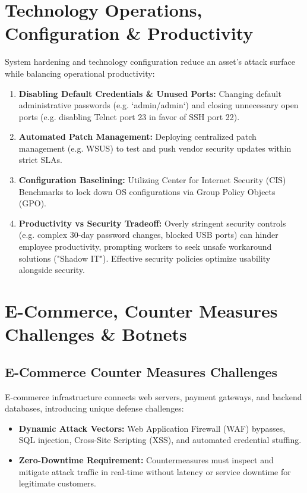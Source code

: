 \documentclass[12pt,a4paper]{article}
\begin{document}
\section{Technology Operations, Configuration \& Productivity}

System hardening and technology configuration reduce an asset's attack surface while balancing operational productivity:

\begin{enumerate}[leftmargin=*, itemsep=4pt]
  \item \textbf{Disabling Default Credentials \& Unused Ports:} Changing default administrative passwords (e.g. `admin/admin`) and closing unnecessary open ports (e.g. disabling Telnet port 23 in favor of SSH port 22).
  \item \textbf{Automated Patch Management:} Deploying centralized patch management (e.g. WSUS) to test and push vendor security updates within strict SLAs.
  \item \textbf{Configuration Baselining:} Utilizing Center for Internet Security (CIS) Benchmarks to lock down OS configurations via Group Policy Objects (GPO).
  \item \textbf{Productivity vs Security Tradeoff:} Overly stringent security controls (e.g. complex 30-day password changes, blocked USB ports) can hinder employee productivity, prompting workers to seek unsafe workaround solutions ("Shadow IT"). Effective security policies optimize usability alongside security.
\end{enumerate}

\section{E-Commerce, Counter Measures Challenges \& Botnets}

\subsection{E-Commerce Counter Measures Challenges}
E-commerce infrastructure connects web servers, payment gateways, and backend databases, introducing unique defense challenges:
\begin{itemize}[leftmargin=*, itemsep=3pt]
  \item \textbf{Dynamic Attack Vectors:} Web Application Firewall (WAF) bypasses, SQL injection, Cross-Site Scripting (XSS), and automated credential stuffing.
  \item \textbf{Zero-Downtime Requirement:} Countermeasures must inspect and mitigate attack traffic in real-time without latency or service downtime for legitimate customers.
\end{itemize}
\end{document}
